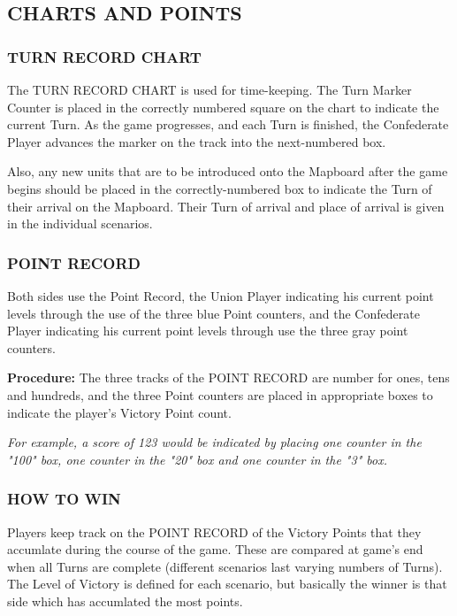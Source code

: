 \subsection{CHARTS AND POINTS}

\subsubsection{TURN RECORD CHART}

The TURN RECORD CHART is used for time-keeping. The Turn Marker Counter is placed in the correctly numbered square on the chart to indicate the current Turn. As the game progresses, and each Turn is finished, the Confederate Player advances the marker on the track into the next-numbered box.

Also, any new units that are to be introduced onto the Mapboard after the game begins should be placed in the correctly-numbered box to indicate the Turn of their arrival on the Mapboard. Their Turn of arrival and place of arrival is given in the individual scenarios.

\subsubsection{POINT RECORD}

Both sides use the Point Record, the Union Player indicating his current point levels through the use of the three blue Point counters, and the Confederate Player indicating his current point levels through use the three gray point counters.

\textbf{Procedure:} The three tracks of the POINT RECORD are number for ones, tens and hundreds, and the three Point counters are placed in appropriate boxes to indicate the player's Victory Point count.

\textit{For example, a score of 123 would be indicated by placing one counter in the "100" box, one counter in the "20" box and one counter in the "3" box.}

\subsubsection{HOW TO WIN}

Players keep track on the POINT RECORD of the Victory Points that they accumlate during the course of the game. These are compared at game's end when all Turns are complete (different scenarios last varying numbers of Turns). The Level of Victory is defined for each scenario, but basically the winner is that side which has accumlated the most points.

